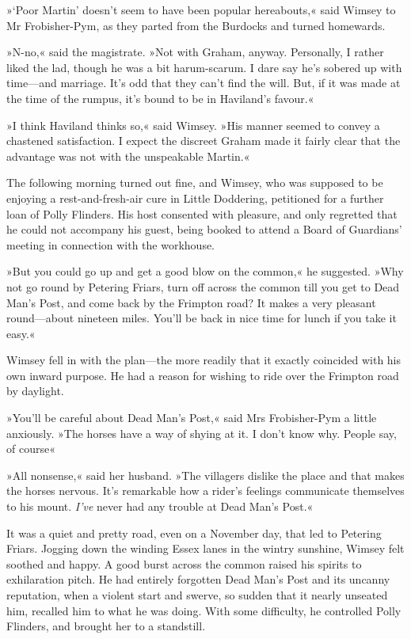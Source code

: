 »`Poor Martin' doesn't seem to have been popular hereabouts,« said Wimsey to Mr Frobisher-Pym, as they parted from the Burdocks and turned homewards.

»N-no,« said the magistrate. »Not with Graham, anyway. Personally, I rather liked the lad, though he was a bit harum-scarum. I dare say he's sobered up with time—and marriage. It's odd that they can't find the will. But, if it was made at the time of the rumpus, it's bound to be in Haviland's favour.«

»I think Haviland thinks so,« said Wimsey. »His manner seemed to convey a chastened satisfaction. I expect the discreet Graham made it fairly clear that the advantage was not with the unspeakable Martin.«

The following morning turned out fine, and Wimsey, who was supposed to be enjoying a rest-and-fresh-air cure in Little Doddering, petitioned for a further loan of Polly Flinders. His host consented with pleasure, and only regretted that he could not accompany his guest, being booked to attend a Board of Guardians' meeting in connection with the workhouse.

»But you could go up and get a good blow on the common,« he suggested. »Why not go round by Petering Friars, turn off across the common till you get to Dead Man's Post, and come back by the Frimpton road? It makes a very pleasant round—about nineteen miles. You'll be back in nice time for lunch if you take it easy.«

Wimsey fell in with the plan—the more readily that it exactly coincided with his own inward purpose. He had a reason for wishing to ride over the Frimpton road by daylight.

»You'll be careful about Dead Man's Post,« said Mrs Frobisher-Pym a little anxiously. »The horses have a way of shying at it. I don't know why. People say, of course\longdash«

»All nonsense,« said her husband. »The villagers dislike the place and that makes the horses nervous. It's remarkable how a rider's feelings communicate themselves to his mount. \textit{I've} never had any trouble at Dead Man's Post.«

It was a quiet and pretty road, even on a November day, that led to Petering Friars. Jogging down the winding Essex lanes in the wintry sunshine, Wimsey felt soothed and happy. A good burst across the common raised his spirits to exhilaration pitch. He had entirely forgotten Dead Man's Post and its uncanny reputation, when a violent start and swerve, so sudden that it nearly unseated him, recalled him to what he was doing. With some difficulty, he controlled Polly Flinders, and brought her to a standstill.

